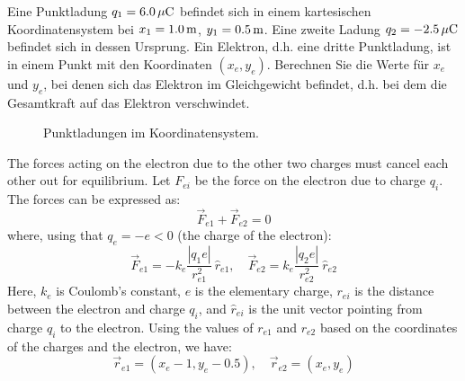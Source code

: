 \begin{ejercicio}
    Eine Punktladung $q_1=\unit[6.0]{\mu C}$ befindet sich in einem kartesischen Koordinatensystem bei $x_1=\unit[1.0]{m}$, $y_1=\unit[0.5]{m}$. Eine zweite Ladung $q_2=\unit[-2.5]{\mu C}$ befindet sich in dessen Ursprung. Ein Elektron, d.h. eine dritte Punktladung, ist in einem Punkt mit den Koordinaten $(x_e,y_e)$. Berechnen Sie die Werte für $x_e$ und $y_e$, bei denen sich das Elektron im Gleichgewicht befindet, d.h. bei dem die Gesamtkraft auf das Elektron verschwindet.
    \begin{figure}
        \centering
        \caption{Punktladungen im Koordinatensystem.}
        \label{fig:point_charges}
    \end{figure}

    The forces acting on the electron due to the other two charges must cancel each other out for equilibrium. Let $F_{ei}$ be the force on the electron due to charge $q_i$. The forces can be expressed as:
    \begin{equation*}
        \vec{F}_{e1} + \vec{F}_{e2} = 0
    \end{equation*}
    where, using that $q_e=-e<0$ (the charge of the electron):
    \begin{equation*}
        \vec{F}_{e1} = -k_e \frac{|q_1 e|}{r_{e1}^2} \ \hat{r}_{e1}, \quad \vec{F}_{e2} = k_e \frac{|q_2 e|}{r_{e2}^2} \ \hat{r}_{e2}
    \end{equation*}
    Here, $k_e$ is Coulomb's constant, $e$ is the elementary charge, $r_{ei}$ is the distance between the electron and charge $q_i$, and $\hat{r}_{ei}$ is the unit vector pointing from charge $q_i$ to the electron. Using the values of $r_{e1}$ and $r_{e2}$ based on the coordinates of the charges and the electron, we have:
    \begin{equation*}
        \vec{r}_{e1} = (x_e - 1, y_e - 0.5), \quad \vec{r}_{e2} = (x_e, y_e)
    \end{equation*}


\end{ejercicio}
